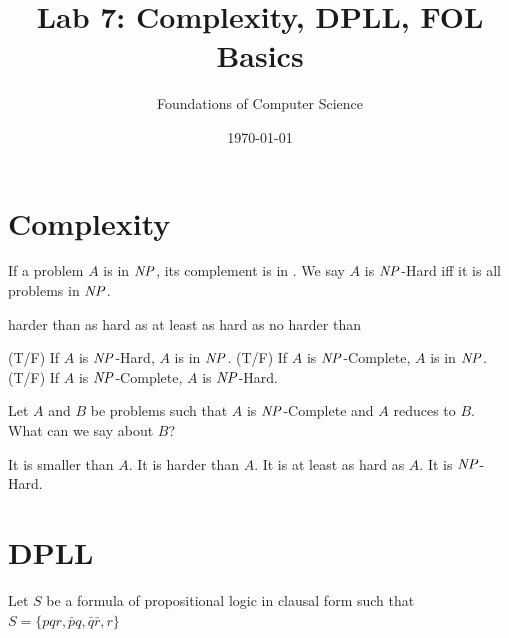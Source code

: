 \documentclass[]{exam}
\title{Lab 7: Complexity, DPLL, FOL Basics}
\author{Foundations of Computer Science}
\date{\today}
\newcommand{\tf}[1][{}]{%
\fillin[#1][0.25in]%
}
\begin{document}
\maketitle
\setlength{\columnseprule}{1pt}
\section*{Complexity}
\begin{questions} 
\question If a problem $A$ is in $\mbox{\it NP\/}$, its complement is in \fillin[CoNP].
\question We say $A$ is $\mbox{\it NP\/}$-Hard iff it is \fillin all problems in $\mbox{\it NP\/}$.
\begin{checkboxes}
\choice harder than
\choice as hard as
\CorrectChoice at least as hard as
\choice no harder than
\end{checkboxes}

\question \tf[F] (T/F) If $A$ is $\mbox{\it NP\/}$-Hard, $A$ is in $\mbox{\it NP\/}$.
\question \tf[T] (T/F) If $A$ is $\mbox{\it NP\/}$-Complete, $A$ is in $\mbox{\it NP\/}$.
\question \tf[T] (T/F) If $A$ is $\mbox{\it NP\/}$-Complete, $A$ is $\mbox{\it NP\/}$-Hard.

\question Let $A$ and $B$ be problems such that $A$ is $\mbox{\it NP\/}$-Complete
and $A$ reduces to $B$. What can we say about $B$?
\begin{checkboxes}
\choice It is smaller than $A$.
\choice It is harder than $A$.
\CorrectChoice It is at least as hard as $A$.
\CorrectChoice It is $\mbox{\it NP\/}$-Hard.
\end{checkboxes}

\section*{DPLL}

\question Let $S$ be a formula of propositional logic in clausal form such that
$S = \{pqr, \bar{p}q, \bar{q}\bar{r}, r \}$\\

\end{questions}
\end{document}
